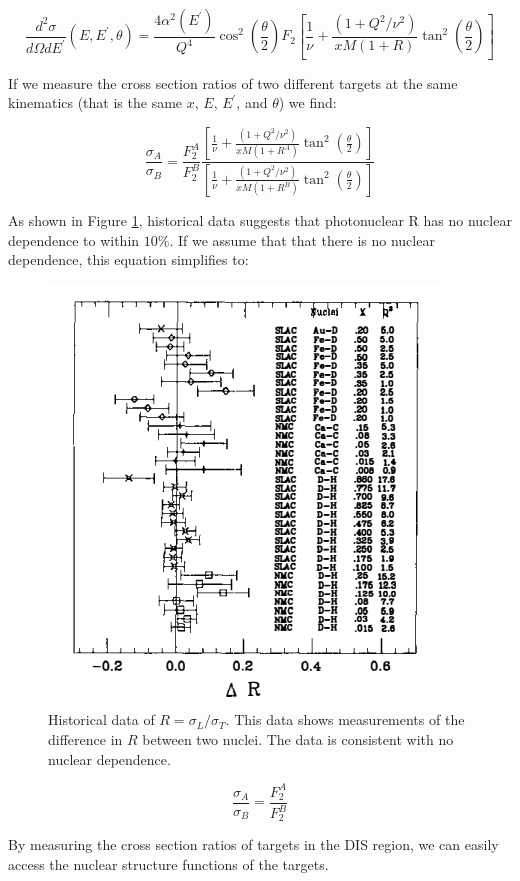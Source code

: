 \begin{equation}
	\frac{d^2\sigma}{d\Omega dE^\prime}\left(E,E^\prime,\theta\right) = \frac{4\alpha^2\left(E^\prime\right)}{Q^4}\cos^2\left(\frac{\theta}{2}\right)F_2\left[\frac{1}{\nu}+\frac{\left(1+Q^2/\nu^2\right)}{xM\left(1+R\right)}\tan^2\left(\frac{\theta}{2}\right)\right]
\end{equation}

If we measure the cross section ratios of two different targets at the same kinematics (that is the same $x$, $E$, $E^\prime$, and $\theta$) we find:

\begin{equation}
	\frac{\sigma_A}{\sigma_B} = \frac{F_2^A}{F_2^B} \frac{\left[\frac{1}{\nu}+\frac{\left(1+Q^2/\nu^2\right)}{xM\left(1+R^A\right)}\tan^2\left(\frac{\theta}{2}\right)\right]}{\left[\frac{1}{\nu}+\frac{\left(1+Q^2/\nu^2\right)}{xM\left(1+R^B\right)}\tan^2\left(\frac{\theta}{2}\right)\right]}
\end{equation}

As shown in Figure \ref{R_no_A}, historical data suggests that photonuclear R has no nuclear dependence to within $10\%$. If we assume that that there is no nuclear dependence, this equation simplifies to:

\begin{figure}
\begin{center}
	\includegraphics{./scattering/fig/R_LT.png}
	\caption{Historical data of $R=\sigma_L/\sigma_T$. This data shows measurements of the difference in $R$ between two nuclei. The data is consistent with no nuclear dependence.\cite{GST}}
	\label{R_no_A}
\end{center}
\end{figure}

\begin{equation}
	\frac{\sigma_A}{\sigma_B} = \frac{F_2^A}{F_2^B}
\end{equation}

By measuring the cross section ratios of targets in the DIS region, we can easily access the nuclear structure functions of the targets.